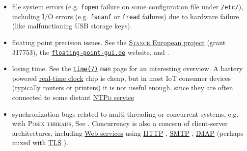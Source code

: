 {{\begin{itemize}
 \item file system  errors (e.g. \texttt{fopen}
   failure on some  
    configuration
   file under \texttt{/etc/}), including I/O errors 
     (e.g. \texttt{fscanf} or \texttt{fread} failures) due
    to hardware failure (like malfunctioning USB
   storage keys).

     \item floating point  precision
       issues.  See the  \href{http://www.stance-project.eu/}{\textsc{Stance}
         European project} (grant 317753), the
       \href{https://floating-point-gui.de/}{\texttt{floating-point-gui.de}}
       website, and \cite{Kiss:2015:combining, goubault:2011:static}.

     \item losing  time. See the
       \href{https://man7.org/linux/man-pages/man7/time.7.html}{\texttt{time(7)}}
       \texttt{man} page for an interesting overview. A battery
       powered 
       \href{https://en.wikipedia.org/wiki/Real-time_clock}{real-time
         clock} chip is cheap, but in most IoT consumer devices
       (typically routers or printers) it is not useful enough, since
       they are often connected to some distant
       \href{https://en.wikipedia.org/wiki/Ntpd}{\textsc{NTPd}
         service}

       \item synchronization bugs related to multi-threading or
         concurrent systems, e.g. with \textsc{Posix threads}, See
         \cite{goubault:2005:practical, sangiorgi:2003:pi,
           david:2013:everything,
           guerraoui:2018:concurrent-systems}. Concurrency is also a
         concern of client-server architectures, including
         \href{https://en.wikipedia.org/wiki/Web_service}{Web
           services}  using
         \href{https://en.wikipedia.org/wiki/Hypertext_Transfer_Protocol}{HTTP}
         ,
         \href{https://en.wikipedia.org/wiki/Simple_Mail_Transfer_Protocol}{SMTP}
         ,
         \href{https://en.wikipedia.org/wiki/Internet_Message_Access_Protocol}{IMAP}
          (perhaps mixed with
         \href{https://en.wikipedia.org/wiki/Transport_Layer_Security}{TLS}
         ).
         

\end{itemize}}}
